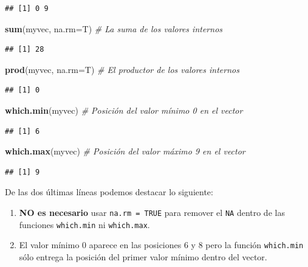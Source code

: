\documentclass[10pt,]{krantz}
\makeatletter
\newenvironment{Shaded}{\begin{snugshade}}{\end{snugshade}}
\newcommand{\KeywordTok}[1]{\textcolor[rgb]{0.13,0.29,0.53}{\textbf{{#1}}}}
\newcommand{\DataTypeTok}[1]{\textcolor[rgb]{0.13,0.29,0.53}{{#1}}}
\newcommand{\CommentTok}[1]{\textcolor[rgb]{0.56,0.35,0.01}{\textit{{#1}}}}
\newcommand{\NormalTok}[1]{{#1}}
\providecommand{\tightlist}{%
  \setlength{\itemsep}{0pt}\setlength{\parskip}{0pt}}
\newenvironment{kframe}{%
\medskip{}
\setlength{\fboxsep}{.8em}
 \def\at@end@of@kframe{}%
 \ifinner\ifhmode%
  \def\at@end@of@kframe{\end{minipage}}%
  \begin{minipage}{\columnwidth}%
 \fi\fi%
 \def\FrameCommand##1{\hskip\@totalleftmargin \hskip-\fboxsep
 \colorbox{shadecolor}{##1}\hskip-\fboxsep
     \hskip-\linewidth \hskip-\@totalleftmargin \hskip\columnwidth}%
 \MakeFramed {\advance\hsize-\width
   \@totalleftmargin\z@ \linewidth\hsize
   \@setminipage}}%
 {\par\unskip\endMakeFramed%
 \at@end@of@kframe}
\renewenvironment{Shaded}{\begin{kframe}}{\end{kframe}}
\makeatother
\begin{document}
\begin{verbatim}
## [1] 0 9
\end{verbatim}

\begin{Shaded}
\begin{Highlighting}[]
\KeywordTok{sum}\NormalTok{(myvec, }\DataTypeTok{na.rm=}\NormalTok{T)  }\CommentTok{# La suma de los valores internos}
\end{Highlighting}
\end{Shaded}

\begin{verbatim}
## [1] 28
\end{verbatim}

\begin{Shaded}
\begin{Highlighting}[]
\KeywordTok{prod}\NormalTok{(myvec, }\DataTypeTok{na.rm=}\NormalTok{T)  }\CommentTok{# El productor de los valores internos}
\end{Highlighting}
\end{Shaded}

\begin{verbatim}
## [1] 0
\end{verbatim}

\begin{Shaded}
\begin{Highlighting}[]
\KeywordTok{which.min}\NormalTok{(myvec)  }\CommentTok{# Posición del valor mínimo 0 en el vector}
\end{Highlighting}
\end{Shaded}

\begin{verbatim}
## [1] 6
\end{verbatim}

\begin{Shaded}
\begin{Highlighting}[]
\KeywordTok{which.max}\NormalTok{(myvec)  }\CommentTok{# Posición del valor máximo 9 en el vector}
\end{Highlighting}
\end{Shaded}

\begin{verbatim}
## [1] 9
\end{verbatim}

De las dos últimas líneas podemos destacar lo siguiente:

\begin{enumerate}
\def\labelenumi{\arabic{enumi}.}
\tightlist
\item
  \textbf{NO es necesario} usar \texttt{na.rm\ =\ TRUE} para remover el
  \texttt{NA} dentro de las funciones \texttt{which.min} ni
  \texttt{which.max}.
\item
  El valor mínimo 0 aparece en las posiciones 6 y 8 pero la función
  \texttt{which.min} sólo entrega la posición del primer valor mínimo
  dentro del vector.
\end{enumerate}
\end{document}
